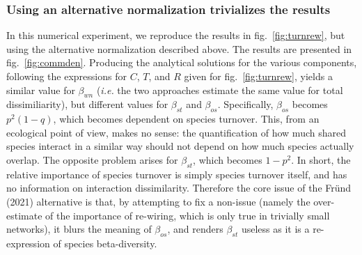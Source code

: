 \documentclass[10pt,oneside]{article}
\begin{document}
\hypertarget{using-an-alternative-normalization-trivializes-the-results}{%
\subsubsection{Using an alternative normalization trivializes the
results}\label{using-an-alternative-normalization-trivializes-the-results}}

In this numerical experiment, we reproduce the results in
fig.~\ref{fig:turnrew}, but using the alternative normalization
described above. The results are presented in fig.~\ref{fig:commden}.
Producing the analytical solutions for the various components, following
the expressions for \(C\), \(T\), and \(R\) given for
fig.~\ref{fig:turnrew}, yields a similar value for \(\beta_{wn}\)
(\emph{i.e.} the two approaches estimate the same value for total
dissimiliarity), but different values for \(\beta_{st}\) and
\(\beta_{os}\). Specifically, \(\beta_{os}\) becomes \(p^2(1-q)\), which
becomes dependent on species turnover. This, from an ecological point of
view, makes no sense: the quantification of how much shared species
interact in a similar way should not depend on how much species actually
overlap. The opposite problem arises for \(\beta_{st}\), which becomes
\(1-p^2\). In short, the relative importance of species turnover is
simply species turnover itself, and has no information on interaction
dissimilarity. Therefore the core issue of the Fründ (2021) alternative
is that, by attempting to fix a non-issue (namely the over-estimate of
the importance of re-wiring, which is only true in trivially small
networks), it blurs the meaning of \(\beta_{os}\), and renders
\(\beta_{st}\) useless as it is a re-expression of species
beta-diversity.
\end{document}
